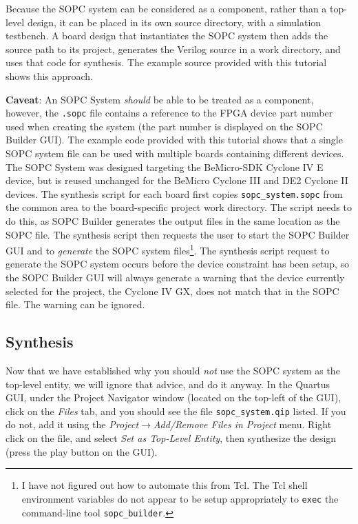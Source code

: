 \documentclass[10pt,twoside]{article}
\begin{document}
Because the SOPC system can be considered as a component, rather than
a top-level design, it can be placed in its own source directory, 
with a simulation testbench. A board design that instantiates the
SOPC system then adds the source path to its project, 
generates the Verilog source in a work directory, and uses that code
for synthesis. The example source provided with this tutorial
shows this approach.

\vskip5mm
{\bf Caveat}: An SOPC System {\em should} be able to be treated
as a component, however, the \verb+.sopc+ file contains a
reference to the FPGA device part number used when creating
the system (the part number is displayed on the SOPC Builder GUI).
The example code provided with this tutorial shows that a
single SOPC system file can be used with multiple boards
containing different devices. The SOPC System was designed
targeting the BeMicro-SDK Cyclone IV E device, but is reused
unchanged for the BeMicro Cyclone III and DE2 Cyclone II devices.
The synthesis script for each board first copies
\verb+sopc_system.sopc+ from the common area to the board-specific 
project work directory. The script needs to do this, as SOPC Builder
generates the output files in the same location as the SOPC file.
The synthesis script then requests the user to start the SOPC
Builder GUI and to {\em generate} the SOPC system files\footnote{I have
not figured out how to automate this from Tcl. The Tcl shell 
environment variables do not appear to be setup appropriately to
{\tt exec} the command-line tool {\tt sopc\_builder}.}.
The synthesis script request to generate the SOPC system occurs 
before the device constraint has been setup, so the SOPC Builder
GUI will always generate a warning that the device currently selected
for the project, the Cyclone IV GX, does not match that in
the SOPC file. The warning can be ignored.

\subsection{Synthesis}
\label{sec:sopc_system_synthesis}

Now that we have established why you should {\em not} use the SOPC 
system as the top-level entity, we will ignore that advice,
and do it anyway. In the Quartus GUI, under the Project Navigator
window (located on the top-left of the GUI), click on the 
{\em Files} tab, and you should see the file \verb+sopc_system.qip+
listed. If you do not,  add it using the 
{\em Project$\rightarrow$Add/Remove Files in Project} menu.
Right click on the file, and select {\em Set as Top-Level Entity},
then synthesize the design (press the play button on the GUI).
\end{document}
